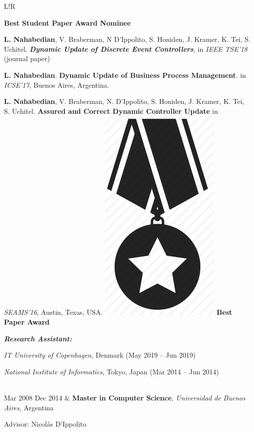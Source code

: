\documentclass[10pt]{article}
\newcommand\VRule{\color{lightgray}\vrule width 0.5pt}
\begin{document}
\begin{tabular}{L!{\VRule}R}
\begin{compactitem}
	\textbf{Best Student Paper Award Nominee}
	\item \textbf{L. Nahabedian}, V. Braberman, N D'Ippolito, S. Honiden, 
	J. 
	Kramer, K. Tei, 
	S. Uchitel.
	\textbf{\textit{Dynamic Update of Discrete Event Controllers}}, in 
	\textit{IEEE TSE'18} (journal paper)
	\item \textbf{L. Nahabedian}. \textbf{Dynamic Update of Business 
	Process
		Management}. in \textit{ICSE'17}, Buenos Aires, Argentina.
	\item \textbf{L. Nahabedian}, V. Braberman, N. D'Ippolito, S. Honiden, 
	J. Kramer, K. Tei, S. Uchitel. \textbf{Assured and Correct
		Dynamic Controller Update} in \textit{SEAMS'16}, Austin, Texas, 
		USA. 
		\includegraphics[scale=0.022]{../img/medal.png}
	\textbf{Best Paper Award}
	\end{compactitem}
	\textit{\textbf{Research Assistant:}}
	\begin{compactitem}
\item \textit{IT University of 	Copenhagen}, Denmark (May 2019 -- Jun 2019)
\item \textit{National Institute of Informatics}, Tokyo, Japan (Mar 2014 -- Jun 
2014)
	\end{compactitem}
	\\
	Mar 2008 Dec 2014 & \textbf{Master in Computer Science}, 
	\textit{Universidad de Buenos Aires}, Argentina
	
	Advisor: Nicol\'as D'Ippolito \\
\end{tabular}
\end{document}
